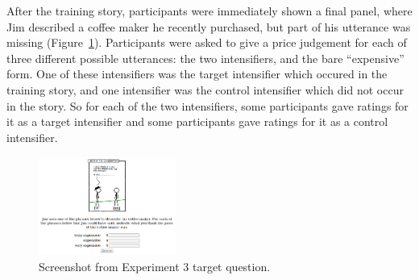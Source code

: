 \documentclass[10pt,letterpaper]{article}
\begin{document}
After the training story, participants were immediately shown a final panel, where Jim described a coffee maker he recently purchased, but part of his utterance was missing (Figure~\ref{exp3-q}).
Participants were asked to give a price judgement for each of three different possible utterances: the two intensifiers, and the bare ``expensive'' form.
One of these intensifiers was the target intensifier which occured in the training story, and one intensifier was the control intensifier which did not occur in the story.
So for each of the two intensifiers, some participants gave ratings for it as a target intensifier and some participants gave ratings for it as a control intensifier.

% 
% 

\begin{figure}[ht]
\begin{center}
\includegraphics[width=0.4\textwidth]{analysis_files_for_writeup/images/exp3-q.png}
\end{center}
\caption{Screenshot from Experiment 3 target question.} 
\label{exp3-q}
\end{figure}
\end{document}
